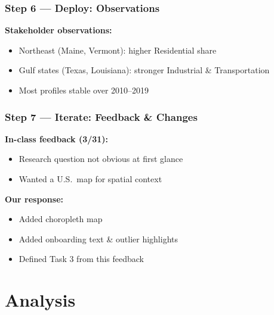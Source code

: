 \documentclass{beamer}
\begin{document}
\begin{frame}
    \frametitle{Step 6 --- Deploy: Observations}

    \textbf{Stakeholder observations:}

    \bigskip

    \begin{itemize}
        \item Northeast (Maine, Vermont): higher Residential share

        \bigskip
        \item Gulf states (Texas, Louisiana): stronger Industrial \& Transportation

        \bigskip
        \item Most profiles stable over 2010--2019
    \end{itemize}
\end{frame}


\begin{frame}
    \frametitle{Step 7 --- Iterate: Feedback \& Changes}

    \textbf{In-class feedback (3/31):}

    \bigskip

    \begin{itemize}
        \item Research question not obvious at first glance
        \item Wanted a \alert{U.S.\ map} for spatial context
    \end{itemize}

    \bigskip
    \bigskip

    \textbf{Our response:}
    \begin{itemize}
        \item Added choropleth map
        \item Added onboarding text \& outlier highlights
        \item Defined Task 3 from this feedback
    \end{itemize}
\end{frame}


\section{Analysis}
\end{document}

